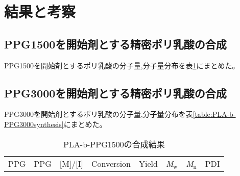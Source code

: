 \section{結果と考察}
\subsection{PPG1500を開始剤とする精密ポリ乳酸の合成}
PPG1500を開始剤とするポリ乳酸の分子量,分子量分布を表\ref{table:PLA-b-PPG1500synthesis}にまとめた。
\subsection{PPG3000を開始剤とする精密ポリ乳酸の合成}
PPG3000を開始剤とするポリ乳酸の分子量,分子量分布を表\ref{table:PLA-b-PPG3000synthesis}にまとめた。

\begin{table}[h]
    \caption{PLA-b-PPG1500の合成結果}
    \label{table:PLA-b-PPG1500synthesis}
    \centering
      \begin{tabular}{cccccccc}
        \hline
        PPG & PPG & [M]/[I] & Conversion & Yield & \textit{M}${}_\textrm{w}$ & \textit{M}${}_\textrm{n}$ & PDI
        
      \end{tabular}
\end{table}
